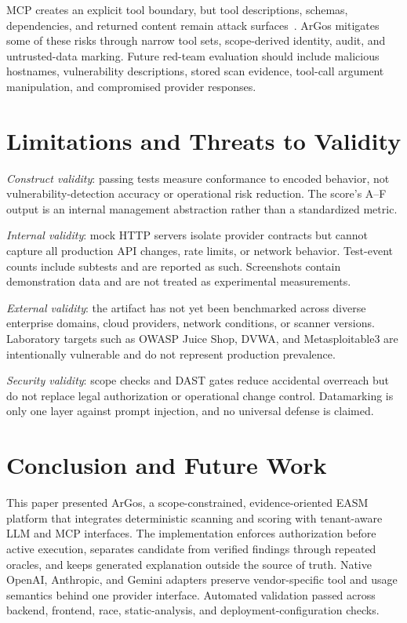 \documentclass[conference,a4paper]{IEEEtran}
\newcommand{\argos}{ArGos\xspace}
\begin{document}
MCP creates an explicit tool boundary, but tool descriptions, schemas, dependencies, and returned content remain attack surfaces~\cite{Hou2025MCP,Hasan2026MCP}. \argos mitigates some of these risks through narrow tool sets, scope-derived identity, audit, and untrusted-data marking. Future red-team evaluation should include malicious hostnames, vulnerability descriptions, stored scan evidence, tool-call argument manipulation, and compromised provider responses.

\section{Limitations and Threats to Validity}

\textit{Construct validity}: passing tests measure conformance to encoded behavior, not vulnerability-detection accuracy or operational risk reduction. The score's A--F output is an internal management abstraction rather than a standardized metric.

\textit{Internal validity}: mock HTTP servers isolate provider contracts but cannot capture all production API changes, rate limits, or network behavior. Test-event counts include subtests and are reported as such. Screenshots contain demonstration data and are not treated as experimental measurements.

\textit{External validity}: the artifact has not yet been benchmarked across diverse enterprise domains, cloud providers, network conditions, or scanner versions. Laboratory targets such as OWASP Juice Shop, DVWA, and Metasploitable3 are intentionally vulnerable and do not represent production prevalence.

\textit{Security validity}: scope checks and DAST gates reduce accidental overreach but do not replace legal authorization or operational change control. Datamarking is only one layer against prompt injection, and no universal defense is claimed.

\section{Conclusion and Future Work}

This paper presented \argos, a scope-constrained, evidence-oriented EASM platform that integrates deterministic scanning and scoring with tenant-aware LLM and MCP interfaces. The implementation enforces authorization before active execution, separates candidate from verified findings through repeated oracles, and keeps generated explanation outside the source of truth. Native OpenAI, Anthropic, and Gemini adapters preserve vendor-specific tool and usage semantics behind one provider interface. Automated validation passed across backend, frontend, race, static-analysis, and deployment-configuration checks.
\end{document}
